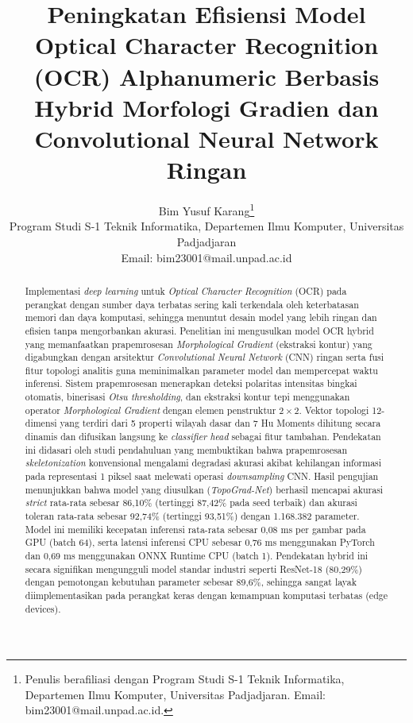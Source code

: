 \documentclass[journal]{IEEEtran}
\begin{document}
\title{Peningkatan Efisiensi Model Optical Character Recognition (OCR) Alphanumeric Berbasis Hybrid Morfologi Gradien dan Convolutional Neural Network Ringan}

\author{Bim Yusuf Karang\thanks{Penulis berafiliasi dengan Program Studi S-1 Teknik Informatika, Departemen Ilmu Komputer, Universitas Padjadjaran. Email: bim23001@mail.unpad.ac.id.} \\
\small Program Studi S-1 Teknik Informatika, Departemen Ilmu Komputer, Universitas Padjadjaran \\
\small Email: bim23001@mail.unpad.ac.id}


\maketitle

\begin{abstract}
Implementasi \textit{deep learning} untuk \textit{Optical Character Recognition} (OCR) pada perangkat dengan sumber daya terbatas sering kali terkendala oleh keterbatasan memori dan daya komputasi, sehingga menuntut desain model yang lebih ringan dan efisien tanpa mengorbankan akurasi. Penelitian ini mengusulkan model OCR hybrid yang memanfaatkan prapemrosesan \textit{Morphological Gradient} (ekstraksi kontur) yang digabungkan dengan arsitektur \textit{Convolutional Neural Network} (CNN) ringan serta fusi fitur topologi analitis guna meminimalkan parameter model dan mempercepat waktu inferensi. Sistem prapemrosesan menerapkan deteksi polaritas intensitas bingkai otomatis, binerisasi \textit{Otsu thresholding}, dan ekstraksi kontur tepi menggunakan operator \textit{Morphological Gradient} dengan elemen penstruktur $2 \times 2$. Vektor topologi 12-dimensi yang terdiri dari 5 properti wilayah dasar dan 7 Hu Moments dihitung secara dinamis dan difusikan langsung ke \textit{classifier head} sebagai fitur tambahan. Pendekatan ini didasari oleh studi pendahuluan yang membuktikan bahwa prapemrosesan \textit{skeletonization} konvensional mengalami degradasi akurasi akibat kehilangan informasi pada representasi 1 piksel saat melewati operasi \textit{downsampling} CNN. Hasil pengujian menunjukkan bahwa model yang diusulkan (\textit{TopoGrad-Net}) berhasil mencapai akurasi \textit{strict} rata-rata sebesar 86,10\% (tertinggi 87,42\% pada seed terbaik) dan akurasi toleran rata-rata sebesar 92,74\% (tertinggi 93,51\%) dengan 1.168.382 parameter. Model ini memiliki kecepatan inferensi rata-rata sebesar 0,08 ms per gambar pada GPU (batch 64), serta latensi inferensi CPU sebesar 0,76 ms menggunakan PyTorch dan 0,69 ms menggunakan ONNX Runtime CPU (batch 1). Pendekatan hybrid ini secara signifikan mengungguli model standar industri seperti ResNet-18 (80,29\%) dengan pemotongan kebutuhan parameter sebesar 89,6\%, sehingga sangat layak diimplementasikan pada perangkat keras dengan kemampuan komputasi terbatas (edge devices).
\end{abstract}
\end{document}
